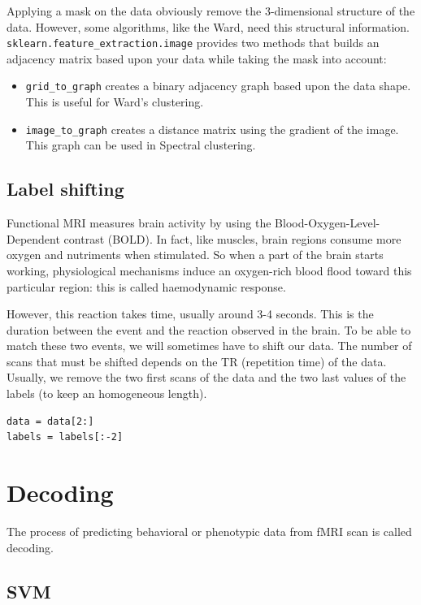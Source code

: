 \documentclass{frontiersSCNS} %
\begin{document}
Applying a mask on the data obviously remove the 3-dimensional structure of the
data. However, some algorithms, like the Ward, need this structural information.
\verb!sklearn.feature_extraction.image! provides two methods that builds an
adjacency matrix based upon your data while taking the mask into account:
\begin{itemize}
    \item \verb!grid_to_graph! creates a binary adjacency graph based upon the
        data shape. This is useful for Ward's clustering.
    \item \verb!image_to_graph! creates a distance matrix using the gradient of
        the image. This graph can be used in Spectral clustering.
\end{itemize}

\subsection{Label shifting}

Functional MRI measures brain activity by using the Blood-Oxygen-Level-Dependent
contrast (BOLD). In fact, like muscles, brain regions consume more oxygen and
nutriments when stimulated. So when a part of the brain starts working,
physiological mechanisms induce an oxygen-rich blood flood toward this
particular region: this is called haemodynamic response.

However, this reaction takes time, usually around 3-4 seconds. This is the
duration between the event and the reaction observed in the brain. To be able to
match these two events, we will sometimes have to shift our data. The number of
scans that must be shifted depends on the TR (repetition time) of the data.
Usually, we remove the two first scans of the data and the two last values of the
labels (to keep an homogeneous length).

\begin{lstlisting}
data = data[2:]
labels = labels[:-2]
\end{lstlisting}

\section{Decoding}

The process of predicting behavioral or phenotypic data from fMRI scan is
called decoding.


\subsection{SVM}
\end{document}

